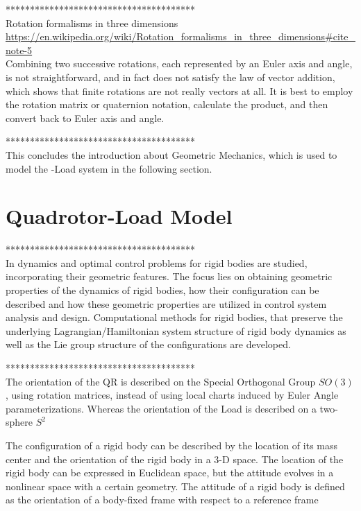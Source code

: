 

***************************************\\
Rotation formalisms in three dimensions \url{https://en.wikipedia.org/wiki/Rotation_formalisms_in_three_dimensions#cite_note-5}\\
Combining two successive rotations, each represented by an Euler axis and angle, is not straightforward, and in fact does not satisfy the law of vector addition, which shows that finite rotations are not really vectors at all. It is best to employ the rotation matrix or quaternion notation, calculate the product, and then convert back to Euler axis and angle.

***************************************\\

This concludes the introduction about Geometric Mechanics, which is used to model the -Load system in the following section.


\section{Quadrotor-Load Model}	


***************************************\\
In \cite{Lee2008} dynamics and optimal control problems for rigid bodies are studied, incorporating their geometric features. The focus lies on obtaining geometric properties of the dynamics of rigid bodies, how their configuration can be described and how these geometric properties are utilized in control system analysis and design. Computational methods for rigid bodies, that preserve the underlying Lagrangian/Hamiltonian system structure of rigid body dynamics as well as the Lie group structure of the configurations are developed.

***************************************\\
The orientation of the QR is described on the Special Orthogonal Group $ SO(3) $, using rotation matrices, instead of using local charts induced by Euler Angle parameterizations. Whereas the orientation of the Load is described on a two-sphere  $ S^2 $

The configuration of a rigid body can be described by the location of its mass center and the orientation of the rigid body in a 3-D space. The location of the rigid body can be expressed in Euclidean space, but the attitude evolves in a nonlinear space with a certain geometry. The attitude of a rigid body is defined as the orientation of a body-fixed frame with respect to a reference frame

